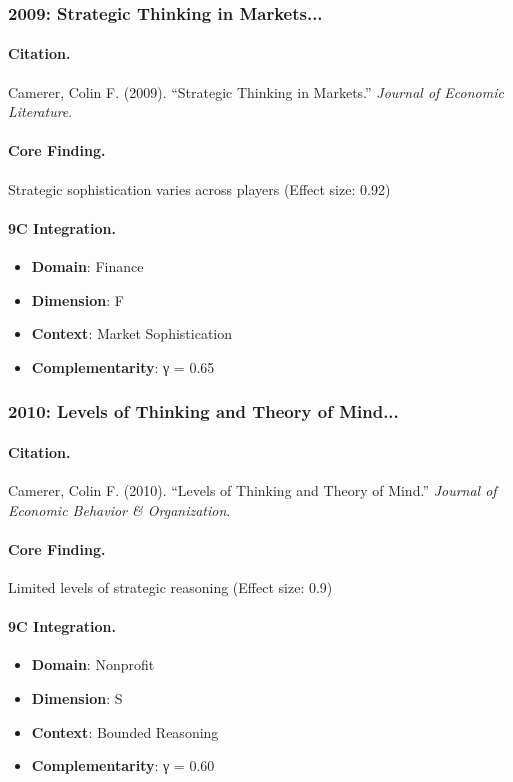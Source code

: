 \subsubsection{2009: Strategic Thinking in Markets...}

\paragraph{Citation.}
Camerer, Colin F. (2009). ``Strategic Thinking in Markets.''
\textit{Journal of Economic Literature}.

\paragraph{Core Finding.}
Strategic sophistication varies across players (Effect size: 0.92)

\paragraph{9C Integration.}
\begin{itemize}[nosep]
  \item \textbf{Domain}: Finance
  \item \textbf{Dimension}: F
  \item \textbf{Context}: Market Sophistication
  \item \textbf{Complementarity}: γ = 0.65
\end{itemize}

\subsubsection{2010: Levels of Thinking and Theory of Mind...}

\paragraph{Citation.}
Camerer, Colin F. (2010). ``Levels of Thinking and Theory of Mind.''
\textit{Journal of Economic Behavior & Organization}.

\paragraph{Core Finding.}
Limited levels of strategic reasoning (Effect size: 0.9)

\paragraph{9C Integration.}
\begin{itemize}[nosep]
  \item \textbf{Domain}: Nonprofit
  \item \textbf{Dimension}: S
  \item \textbf{Context}: Bounded Reasoning
  \item \textbf{Complementarity}: γ = 0.60
\end{itemize}

